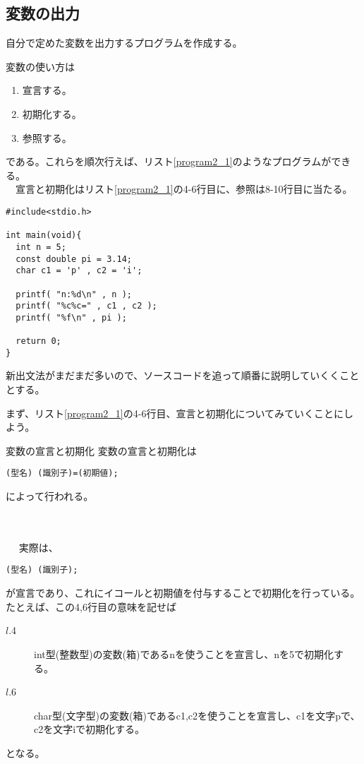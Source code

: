 \subsection{変数の出力}
\begin{boxnote}
自分で定めた変数を出力するプログラムを作成する。
\begin{multicols}{2}
変数の使い方は
\begin{enumerate}
\item 宣言する。
\item 初期化する。
\item 参照する。
\end{enumerate}
である。これらを順次行えば、リスト\ref{program2_1}のようなプログラムができる。\\ 
　宣言と初期化はリスト\ref{program2_1}の4-6行目に、参照は8-10行目に当たる。
\begin{lstlisting}[caption=変数の出力,label=program2_1]
#include<stdio.h>

int main(void){
  int n = 5;
  const double pi = 3.14;
  char c1 = 'p' , c2 = 'i';

  printf( "n:%d\n" , n );
  printf( "%c%c=" , c1 , c2 );
  printf( "%f\n" , pi );

  return 0;
}
\end{lstlisting}
\end{multicols}
\end{boxnote}
新出文法がまだまだ多いので、ソースコードを追って順番に説明していくくこととする。

まず、リスト\ref{program2_1}の4-6行目、宣言と初期化についてみていくことにしよう。
\begin{itembox}[l]{変数の宣言と初期化}
変数の宣言と初期化は
\begin{center}
\verb|(型名) (識別子)=(初期値);|
\end{center}
\begin{flushright}
によって行われる。
\end{flushright}
\end{itembox}
\\ \\　
実際は、
\begin{center}
\verb|(型名) (識別子);|
\end{center}
が宣言であり、これにイコールと初期値を付与することで初期化を行っている。たとえば、この4,6行目の意味を記せば
\begin{description}
\item[$l$.4] int型(整数型)の変数(箱)であるnを使うことを宣言し、nを5で初期化する。
\item[$l$.6] char型(文字型)の変数(箱)であるc1,c2を使うことを宣言し、c1を文字pで、c2を文字iで初期化する。
\end{description}
となる。

